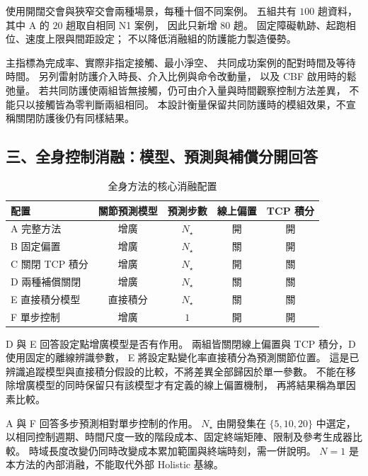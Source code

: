 使用開闊交會與狹窄交會兩種場景，每種十個不同案例。
五組共有 $100$ 趟資料，其中 A 的 $20$ 趟取自相同 N1 案例，
因此只新增 $80$ 趟。
固定障礙軌跡、起跑相位、速度上限與間距設定；
不以降低消融組的防護能力製造優勢。

主指標為完成率、實際非指定接觸、最小淨空、
共同成功案例的配對時間及等待時間。
另列雷射防護介入時長、介入比例與命令改動量，
以及 CBF 啟用時的鬆弛量。
若共同防護使兩組皆無接觸，仍可由介入量與時間觀察控制方法差異，
不能只以接觸皆為零判斷兩組相同。
本設計衡量保留共同防護時的模組效果，不宣稱關閉防護後仍有同樣結果。

\subsection*{三、全身控制消融：模型、預測與補償分開回答}

\begin{table}[htbp]
    \centering
    \caption{全身方法的核心消融配置}
    \label{tab:method_focused_wb_ablation}
    \small
    \renewcommand{\arraystretch}{1.2}
    \begin{tabular}{l c c c c}
        \hline
        配置 & 關節預測模型 & 預測步數 & 線上偏置 & TCP 積分 \\
        \hline
        A 完整方法 & 增廣 & $N_\star$ & 開 & 開 \\
        B 固定偏置 & 增廣 & $N_\star$ & 關 & 開 \\
        C 關閉 TCP 積分 & 增廣 & $N_\star$ & 開 & 關 \\
        D 兩種補償關閉 & 增廣 & $N_\star$ & 關 & 關 \\
        E 直接積分模型 & 直接積分 & $N_\star$ & 關 & 關 \\
        F 單步控制 & 增廣 & $1$ & 開 & 開 \\
        \hline
    \end{tabular}
\end{table}

D 與 E 回答設定點增廣模型是否有作用。
兩組皆關閉線上偏置與 TCP 積分，D 使用固定的離線辨識參數，
E 將設定點變化率直接積分為預測關節位置。
這是已辨識追蹤模型與直接積分假設的比較，不將差異全部歸因於單一參數。
不能在移除增廣模型的同時保留只有該模型才有定義的線上偏置機制，
再將結果稱為單因素比較。

A 與 F 回答多步預測相對單步控制的作用。
$N_\star$ 由開發集在 $\{5,10,20\}$ 中選定，
以相同控制週期、時間尺度一致的階段成本、固定終端矩陣、限制及參考生成器比較。
時域長度改變仍同時改變成本累加範圍與終端時刻，需一併說明。
$N=1$ 是本方法的內部消融，不能取代外部 Holistic 基線。

